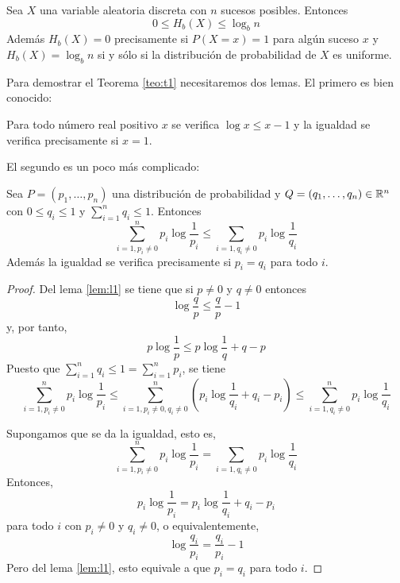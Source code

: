 \begin{teo}\label{teo:t1}
    Sea $X$ una variable aleatoria discreta con $n$ sucesos posibles. Entonces
    $$0\leq H_b(X)\leq\log_bn$$
    Además $H_b(X)=0$ precisamente si $P(X=x)=1$ para algún suceso $x$ y $H_b(X)=\log_bn$ si y sólo si la distribución de probabilidad de $X$ es uniforme.
\end{teo}

Para demostrar el Teorema \ref{teo:t1} necesitaremos dos lemas. El primero es bien conocido:

\begin{lem}\label{lem:l1}
    Para todo número real positivo $x$ se verifica $\log x\leq x-1$ y la igualdad se verifica precisamente si $x=1$.
\end{lem}

El segundo es un poco más complicado:

\begin{lem}
    Sea $P=(p_1,\dots,p_n)$ una distribución de probabilidad y $Q=(q_1,\dots,q_n)\in\mathbb{R}^n$ con $0\leq q_i\leq 1$ y $\sum_{i=1}^nq_i\leq 1$. Entonces
    $$\sum_{i=1, p_i\neq 0}^np_i\log\frac{1}{p_i}\leq\sum_{i=1, q_i\neq 0}p_i\log\frac{1}{q_i}$$
    Además la igualdad se verifica precisamente si $p_i=q_i$ para todo $i$.
\end{lem}

\begin{proof}
    Del lema \ref{lem:l1} se tiene que si $p\neq 0$ y $q\neq 0$ entonces
    $$\log\frac{q}{p}\leq\frac{q}{p}-1$$
    y, por tanto,
    $$p\log\frac{1}{p}\leq p\log\frac{1}{q} + q - p$$
    Puesto que $\sum_{i=1}^n q_i\leq 1=\sum_{i=1}^np_i$, se tiene
    $$\sum_{i=1,p_i\neq 0}^np_i\log\frac{1}{p_i}\leq \sum_{i=1,p_i\neq 0,q_i\neq 0}^n\left(p_i\log\frac{1}{q_i}+q_i-p_i\right)\leq \sum_{i=1,q_i\neq 0}^np_i\log\frac{1}{q_i}$$

    Supongamos que se da la igualdad, esto es, 
    $$\sum_{i=1, p_i\neq 0}^np_i\log\frac{1}{p_i}=\sum_{i=1, q_i\neq 0}p_i\log\frac{1}{q_i}$$
    Entonces,
    $$p_i\log\frac{1}{p_i}=p_i\log\frac{1}{q_i}+q_i-p_i$$
    para todo $i$ con $p_i\neq 0$ y $q_i\neq 0$, o equivalentemente,
    $$\log\frac{q_i}{p_i}=\frac{q_i}{p_i}-1$$
    Pero del lema \ref{lem:l1}, esto equivale a que $p_i=q_i$ para todo $i$.

\end{proof}